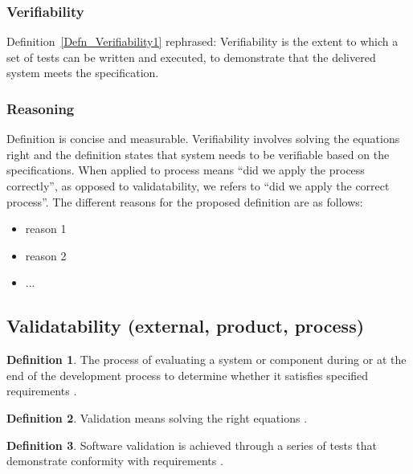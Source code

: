 \documentclass[letterpaper, cleveref]{lipics-v2019}
\newcommand{\authornote}[3]{\textcolor{#1}{[#3 ---#2]}}
\newcommand{\authornote}[3]{}
\newcommand{\oo}[1]{\authornote{magenta}{OO}{#1}} %
\newcommand{\notdone}[1]{\textcolor{red}{#1}}
\theoremstyle{definition}
\newtheorem{defn}{Definition}
\begin{document}
\begin{mybox}
\subsubsection*{Verifiability} Definition~\ref{Defn_Verifiability1}
rephrased: Verifiability is the extent to which a set of tests can be
written and executed, to demonstrate that the delivered system meets the
specification.
\end{mybox}

\subsubsection*{Reasoning} 

Definition is concise and measurable.  Verifiability involves solving the
equations right \citep[p.~23]{Roache1998} and the definition states that system
needs to be verifiable based on the specifications.  When applied to process
means ``did we apply the process correctly'', as opposed to validatability, we
refers to ``did we apply the correct process''.   The different reasons for the
proposed definition are as follows:

\begin{itemize}
  \item reason 1
  \item reason 2
  \item ...
\end{itemize}


\subsection{Validatability (external, product, process)} %

\begin{defn} \label{Defn_Validatability}
  The process of evaluating a system or component during or at the end of the
  development process to determine whether it satisfies specified requirements
  \citep{IEEEStdGlossarySET1990}.
\end{defn}

\begin{defn}
  Validation means solving the right equations \citep[p.~23]{Roache1998}.
\end{defn}

\begin{defn}
  Software validation is achieved through a series of tests that demonstrate
  conformity with requirements \citep{pressman2005software}.
\end{defn}
\end{document}
